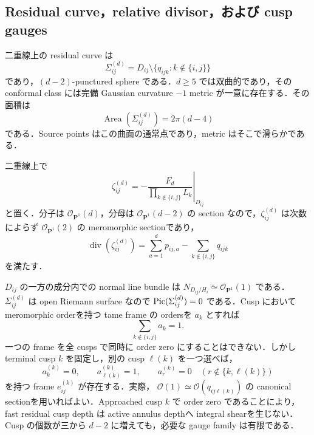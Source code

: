 \documentclass[a4paper,11pt]{ltjsarticle}
\numberwithin{equation}{section}
\theoremstyle{plain}
\theoremstyle{definition}
\theoremstyle{remark}
\newcommand{\PP}{\mathbf P}\newcommand{\CC}{\mathbf C}\newcommand{\RR}{\mathbf R}\newcommand{\ZZ}{\mathbf Z}\newcommand{\NN}{\mathbf N}
\begin{document}
\subsection{Residual curve，relative divisor，および cusp gauges}

二重線上の residual curve は
\begin{equation}\label{eq:degree-d-residual-curve}
 \Sigma_{ij}^{(d)}
 =D_{ij}\setminus\{q_{ijk}:k\notin\{i,j\}\}
\end{equation}
であり，$(d-2)$-punctured sphere である．$d\ge5$ では双曲的であり，その conformal class には完備 Gaussian curvature $-1$ metric が一意に存在する．その面積は
\begin{equation}\label{eq:degree-d-residual-area}
 \operatorname{Area}(\Sigma_{ij}^{(d)})=2\pi(d-4)
\end{equation}
である．Source points はこの曲面の通常点であり，metric はそこで滑らかである．

二重線上で
\begin{equation}\label{eq:degree-d-zeta}
 \zeta_{ij}^{(d)}
 =-\left.\frac{F_d}{\prod_{k\notin\{i,j\}}L_k}\right|_{D_{ij}}
\end{equation}
と置く．分子は $\mathcal O_{\PP^1}(d)$，分母は
$\mathcal O_{\PP^1}(d-2)$ の section なので，$\zeta_{ij}^{(d)}$ は次数によらず
$\mathcal O_{\PP^1}(2)$ の meromorphic sectionであり，
\begin{equation}\label{eq:degree-d-zeta-divisor}
 \operatorname{div}(\zeta_{ij}^{(d)})
 =\sum_{a=1}^d p_{ij,a}
  -\sum_{k\notin\{i,j\}}q_{ijk}
\end{equation}
を満たす．

$D_{ij}$ の一方の成分内での normal line bundle は
$N_{D_{ij}/H_i}\simeq\mathcal O_{\PP^1}(1)$ である．
$\Sigma_{ij}^{(d)}$ は open Riemann surface なので $\operatorname{Pic}(\Sigma_{ij}^{(d)})=0$ である．Cusp において meromorphic orderを持つ tame frame の ordersを $a_k$ とすれば
\begin{equation}\label{eq:degree-d-frame-degree}
 \sum_{k\notin\{i,j\}}a_k=1.
\end{equation}
一つの frame を全 cusps で同時に order zero にすることはできない．しかし terminal cusp $k$ を固定し，別の cusp $\ell(k)$ を一つ選べば，
\begin{equation}\label{eq:degree-d-adapted-orders}
 a_k^{(k)}=0,\qquad a_{\ell(k)}^{(k)}=1,
 \qquad a_r^{(k)}=0\quad
 (r\notin\{k,\ell(k)\})
\end{equation}
を持つ frame $e_{ij}^{(k)}$ が存在する．実際，
$\mathcal O(1)\simeq\mathcal O(q_{ij\ell(k)})$ の canonical sectionを用いればよい．Approached cusp $k$ で order zero であることにより，fast residual cusp depth は active annulus depthへ integral shearを生じない．Cusp の個数が三から $d-2$ に増えても，必要な gauge family は有限である．
\end{document}
